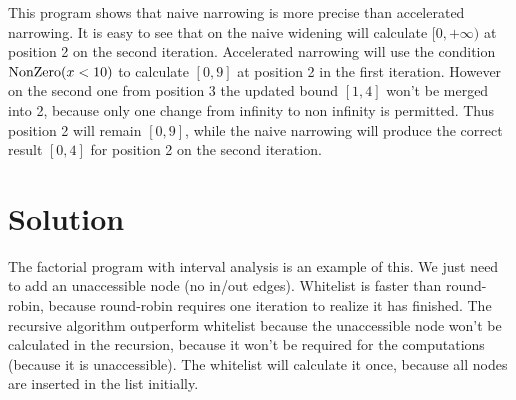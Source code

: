 \documentclass[a4paper]{article}
\begin{document}
This program shows that naive narrowing is more precise than accelerated
narrowing. It is easy to see that on the naive widening will calculate $ [0,
+\infty) $ at position 2 on the second iteration. Accelerated narrowing will
use the condition $ \mathrm{NonZero}(x < 10) $ to calculate $ [0, 9] $ at position 2 in
the first iteration. However on the second one from position 3 the updated
bound $ [1, 4] $ won't be merged into 2, because only one change from infinity
to non infinity is permitted. Thus position 2 will remain $ [0, 9] $, while the
naive narrowing will produce the correct result $ [0, 4] $ for position 2 on
the second iteration.

\section{Solution}

The factorial program with interval analysis is an example of this. We just
need to add an unaccessible node (no in/out edges). Whitelist is faster than
round-robin, because round-robin requires one iteration to realize it has
finished. The recursive algorithm outperform whitelist because the unaccessible
node won't be calculated in the recursion, because it won't be required for the
computations (because it is unaccessible). The whitelist will calculate it
once, because all nodes are inserted in the list initially.
\end{document}

